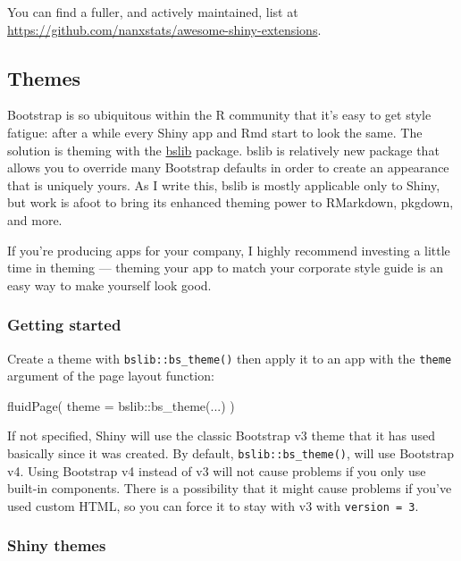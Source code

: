 \documentclass[
]{article}
\newenvironment{Shaded}{\begin{snugshade}}{\end{snugshade}}
\newcommand{\AttributeTok}[1]{\textcolor[rgb]{0.77,0.63,0.00}{#1}}
\newcommand{\FunctionTok}[1]{\textcolor[rgb]{0.00,0.00,0.00}{#1}}
\newcommand{\NormalTok}[1]{#1}
\newcommand{\SpecialCharTok}[1]{\textcolor[rgb]{0.00,0.00,0.00}{#1}}
\begin{document}
You can find a fuller, and actively maintained, list at \url{https://github.com/nanxstats/awesome-shiny-extensions}.

\hypertarget{themes}{%
\subsection{Themes}\label{themes}}

Bootstrap is so ubiquitous within the R community that it's easy to get style fatigue: after a while every Shiny app and Rmd start to look the same.
The solution is theming with the \href{https://rstudio.github.io/bslib}{bslib} package.
bslib is relatively new package that allows you to override many Bootstrap defaults in order to create an appearance that is uniquely yours.
As I write this, bslib is mostly applicable only to Shiny, but work is afoot to bring its enhanced theming power to RMarkdown, pkgdown, and more.

If you're producing apps for your company, I highly recommend investing a little time in theming --- theming your app to match your corporate style guide is an easy way to make yourself look good.

\hypertarget{getting-started}{%
\subsubsection{Getting started}\label{getting-started}}

Create a theme with \texttt{bslib::bs\_theme()} then apply it to an app with the \texttt{theme} argument of the page layout function:

\begin{Shaded}
\begin{Highlighting}[]
\FunctionTok{fluidPage}\NormalTok{(}
  \AttributeTok{theme =}\NormalTok{ bslib}\SpecialCharTok{::}\FunctionTok{bs\_theme}\NormalTok{(...)}
\NormalTok{)}
\end{Highlighting}
\end{Shaded}

If not specified, Shiny will use the classic Bootstrap v3 theme that it has used basically since it was created.
By default, \texttt{bslib::bs\_theme()}, will use Bootstrap v4.
Using Bootstrap v4 instead of v3 will not cause problems if you only use built-in components.
There is a possibility that it might cause problems if you've used custom HTML, so you can force it to stay with v3 with \texttt{version\ =\ 3}.

\hypertarget{shiny-themes}{%
\subsubsection{Shiny themes}\label{shiny-themes}}
\end{document}
